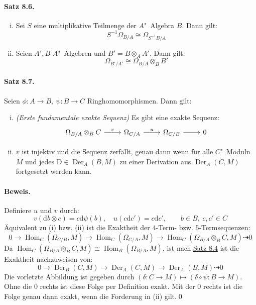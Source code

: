 \paragraph{Satz 8.6.}\label{8.6} \begin{enumerate}[(i)]
\item Sei $S$ eine multiplikative Teilmenge der $A$"~Algebra $B$. Dann gilt:
\[S^{-1}\Omega_{B/A}\cong\Omega_{S^{-1}B/A} \]
\item Seien $A',B$ $A$"~Algebren und $B'=B\otimes_AA'$. Dann gilt:
\[\Omega_{B'/A'}\cong\Omega_{B/A}\otimes_BB' \]
\end{enumerate}

\paragraph{Satz 8.7.}\label{8.7} Seien $\phi:A\to B,\ \psi:B\to C$ Ringhomomorphismen. Dann gilt:
\begin{enumerate}[(i)]
\item \textit{(Erste fundamentale exakte Sequenz)} Es gibt eine exakte Sequenz:
\[\begin{tikzcd}
\Omega_{B/A}\otimes_BC \ar[r, "v"] & \Omega_{C/A} \ar[r, "u"] & \Omega_{C/B}\rar & 0
\end{tikzcd} \]
\item $v$ ist injektiv und die Sequenz zerfällt, genau dann wenn für alle $C$"~Moduln $M$ und jedes $\mathrm{D}\in \operatorname{Der}_A(B,M)$ zu einer Derivation aus $\operatorname{Der}_A(C,M)$ fortgesetzt werden kann.
\end{enumerate}

\paragraph{Beweis.} Definiere $u$ und $v$ durch:
\[v(\mathrm{d}b\otimes c)= c\mathrm{d}\psi(b),\quad u(c\mathrm{d}c') = c\mathrm{d}c',\qquad b\in B,\ c,c'\in C \]
Äquivalent zu (i) bzw. (ii) ist die Exaktheit der $4$-Term- bzw. $5$-Termsequenzen:
\[0\longrightarrow \operatorname{Hom}_C(\Omega_{C/B},M)\longrightarrow \operatorname{Hom}_C(\Omega_{C/A},M)\longrightarrow \operatorname{Hom}_C(\Omega_{B/A}\otimes_B C,M)\dashrightarrow 0  \]
Da $\operatorname{Hom}_C(\Omega_{B/A}\otimes_B C,M)\cong\operatorname{Hom}_B(\Omega_{B/A},M)$, ist nach \hyperref[8.4]{Satz 8.4} ist die Exaktheit nachzuweisen von:
\[0\longrightarrow \operatorname{Der}_B(C,M)\longrightarrow \operatorname{Der}_A(C,M)\longrightarrow \operatorname{Der}_A(B,M)\dashrightarrow 0 \]
Die vorletzte Abbildung ist gegeben durch $(\delta:C\to M)\mapsto (\delta\circ\psi: B\to M)$. Ohne die $0$ rechts ist diese Folge per Definition exakt. Mit der $0$ rechts ist die Folge genau dann exakt, wenn die Forderung in (ii) gilt.\qed


